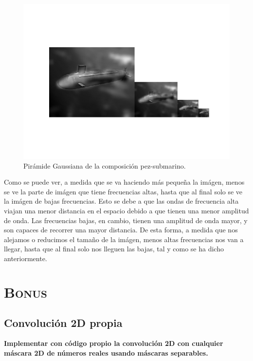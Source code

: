 \documentclass[11pt,a4paper]{article}
\begin{document}
\begin{figure}[H]
\centering
\includegraphics[scale=0.7]{img/hyb-pyr5.png}
\caption{Pirámide Gaussiana de la composición pez-submarino.}
\label{fig:hyb-pyr5}
\end{figure}

Como se puede ver, a medida que se va haciendo más pequeña la imágen, menos se ve la parte de imágen que tiene frecuencias
altas, hasta que al final solo se ve la imágen de bajas frecuencias. Esto se debe a que las ondas de frecuencia alta
viajan una menor distancia en el espacio debido a que tienen una menor amplitud de onda. Las frecuencias bajas,
en cambio, tienen una amplitud de onda mayor, y son capaces de recorrer una mayor distancia. De esta forma, a medida
que nos alejamos o reducimos el tamaño de la imágen, menos altas frecuencias nos van a llegar, hasta que al final solo
nos lleguen las bajas, tal y como se ha dicho anteriormente.

\newpage

\section{\textsc{Bonus}}

\subsection{Convolución 2D propia}

\noindent \textbf{Implementar con código propio la convolución 2D con cualquier máscara 2D de números reales usando
máscaras separables.}
\end{document}
